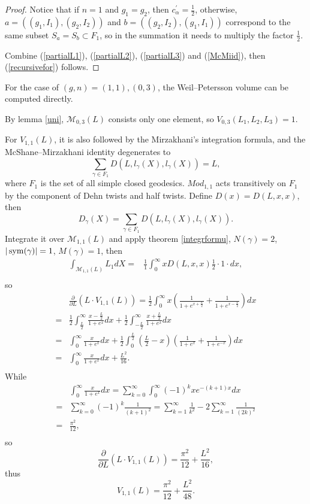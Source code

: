 \begin{proof}
Notice that if $n=1$ and $g_1=g_2$, then $c_\alpha^\prime=\frac{1}{2}$, otherwise, $a=((g_1,I_1),(g_2,I_2))$ and $b=((g_2,I_2),(g_1,I_1))$ correspond to the same subset $S_a=S_b\subset F_{1}$, so in the summation it needs to multiply the factor $\frac{1}{2}$.

Combine (\ref{partialL1}), (\ref{partialL2}), (\ref{partialL3}) and (\ref{McMiid}), then (\ref{recursivefor}) follows.
\end{proof}


For the case of $(g,n)=(1,1),(0,3)$, the Weil--Petersson volume can be computed  directly.

By lemma \ref{uni}, $\mathscr{M}_{0,3}(L)$ consists only one element, so $V_{0,3}(L_1,L_2,L_3)=1$.

For $V_{1,1}(L)$, it is also followed by the Mirzakhani's integration formula, and the McShane--Mirzakhani identity degenerates to 
$$
\sum_{\gamma\in F_{1}}D(L,l_\gamma(X),l_\gamma(X))=L,
$$
where $F_1$ is the set of all simple closed geodesics.  $Mod_{1,1}$ acts transitively on $F_1$ by the component of Dehn twists and half twists. Define $D(x)=D(L,x,x)$, then 
$$
D_\gamma(X)=\sum_{\gamma\in F_1}D(L,l_\gamma(X),l_\gamma(X)).
$$
Integrate it over $\mathscr{M}_{1,1}(L)$ and apply theorem \ref{integrformu}, $N(\gamma)=2$, $|\operatorname{sym}(\gamma)|=1$, $M(\gamma)=1$,
then 
$$\begin{aligned}
    \int_{\mathscr{M}_{1,1}(L)}L_1dX
    =&\frac{1}{1}\int_0^\infty xD(L,x,x)\frac{1}{2}\cdot 1\cdot dx,\\
    \end{aligned}
$$
so $$\begin{aligned}
&\frac{\partial }{\partial L}(L\cdot V_{1,1}(L))=
\frac{1}{2}\int _0^\infty x(\frac{1}{1+e^{x+\frac{L}{2}}}+\frac{1}{1+e^{x-\frac{L}{2}}})dx\\
=&\frac{1}{2}\int_{\frac{L}{2}}^\infty \frac{x-\frac{L}{2}}{1+e^{x}}dx+\frac{1}{2}\int_{-\frac{L}{2}}^\infty \frac{x+\frac{L}{2}}{1+e^{x}}dx\\
=&\int_{0}^\infty\frac{x}{1+e^x}dx+\frac{1}{2}\int_0^{\frac{L}{2}}(\frac{L}{2}-x)(\frac{1}{1+e^x}+\frac{1}{1+e^{-x}})dx\\
=&\int_{0}^\infty\frac{x}{1+e^x}dx+\frac{L^2}{16}.\\
\end{aligned}
$$
While $$\begin{aligned}
&\int_{0}^\infty \frac{x}{1+e^x}dx 
=\sum_{k=0}^\infty \int_0^\infty(-1)^kxe^{-(k+1)x}dx\\
=&\sum_{k=0}^\infty(-1)^k\frac{1}{(k+1)^2}
=\sum_{k=1}^\infty \frac{1}{k^2}-2\sum_{k=1}^\infty\frac{1}{(2k)^2}\\
=&\frac{\pi^2}{12},\\
\end{aligned}
$$
so
$$
\frac{\partial }{\partial L}(L\cdot V_{1,1}(L))=\frac{\pi^2}{12}+\frac{L^2}{16},
$$
thus $$V_{1,1}(L)=\frac{\pi^2}{12}+\frac{L^2}{48}.$$

